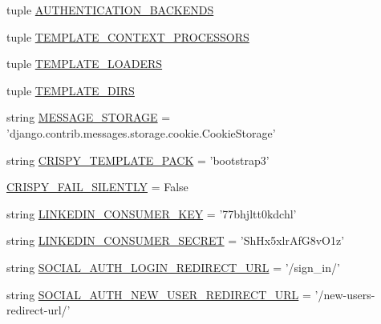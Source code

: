 \begin{DoxyCompactItemize}
\item 
tuple \hyperlink{namespaceleapkit_1_1settings_1_1base__settings_a8d6e27b87a511ee0b026cd46b24cae31}{A\-U\-T\-H\-E\-N\-T\-I\-C\-A\-T\-I\-O\-N\-\_\-\-B\-A\-C\-K\-E\-N\-D\-S}
\item 
tuple \hyperlink{namespaceleapkit_1_1settings_1_1base__settings_a25b8c5ac8956aa2e08f6b950f6f85db3}{T\-E\-M\-P\-L\-A\-T\-E\-\_\-\-C\-O\-N\-T\-E\-X\-T\-\_\-\-P\-R\-O\-C\-E\-S\-S\-O\-R\-S}
\item 
tuple \hyperlink{namespaceleapkit_1_1settings_1_1base__settings_a97efc8d69a72e9c1a3d681fd7bf6d06f}{T\-E\-M\-P\-L\-A\-T\-E\-\_\-\-L\-O\-A\-D\-E\-R\-S}
\item 
tuple \hyperlink{namespaceleapkit_1_1settings_1_1base__settings_a61d895198561c82a92ebcd0e7210fadd}{T\-E\-M\-P\-L\-A\-T\-E\-\_\-\-D\-I\-R\-S}
\item 
string \hyperlink{namespaceleapkit_1_1settings_1_1base__settings_adb93bb897c5ca3ad1b118bdc216c1941}{M\-E\-S\-S\-A\-G\-E\-\_\-\-S\-T\-O\-R\-A\-G\-E} = 'django.\-contrib.\-messages.\-storage.\-cookie.\-Cookie\-Storage'
\item 
string \hyperlink{namespaceleapkit_1_1settings_1_1base__settings_a2659563327876dc3b24d37f2a1be9093}{C\-R\-I\-S\-P\-Y\-\_\-\-T\-E\-M\-P\-L\-A\-T\-E\-\_\-\-P\-A\-C\-K} = 'bootstrap3'
\item 
\hyperlink{namespaceleapkit_1_1settings_1_1base__settings_aebe80968984d3517f6b0034462d69c78}{C\-R\-I\-S\-P\-Y\-\_\-\-F\-A\-I\-L\-\_\-\-S\-I\-L\-E\-N\-T\-L\-Y} = False
\item 
string \hyperlink{namespaceleapkit_1_1settings_1_1base__settings_a5e477c3867f81df4be3cf783bc22e603}{L\-I\-N\-K\-E\-D\-I\-N\-\_\-\-C\-O\-N\-S\-U\-M\-E\-R\-\_\-\-K\-E\-Y} = '77bhjltt0kdchl'
\item 
string \hyperlink{namespaceleapkit_1_1settings_1_1base__settings_a24a347bec71477177517aada03587ba0}{L\-I\-N\-K\-E\-D\-I\-N\-\_\-\-C\-O\-N\-S\-U\-M\-E\-R\-\_\-\-S\-E\-C\-R\-E\-T} = 'Sh\-Hx5xlr\-Af\-G8v\-O1z'
\item 
string \hyperlink{namespaceleapkit_1_1settings_1_1base__settings_a38c3bfc439e1e4cbb1b2753e393181b2}{S\-O\-C\-I\-A\-L\-\_\-\-A\-U\-T\-H\-\_\-\-L\-O\-G\-I\-N\-\_\-\-R\-E\-D\-I\-R\-E\-C\-T\-\_\-\-U\-R\-L} = '/sign\-\_\-in/'
\item 
string \hyperlink{namespaceleapkit_1_1settings_1_1base__settings_a11472300e6b5a9a98e999c62d2dac838}{S\-O\-C\-I\-A\-L\-\_\-\-A\-U\-T\-H\-\_\-\-N\-E\-W\-\_\-\-U\-S\-E\-R\-\_\-\-R\-E\-D\-I\-R\-E\-C\-T\-\_\-\-U\-R\-L} = '/new-\/users-\/redirect-\/url/'
\item 

\end{DoxyCompactItemize}
